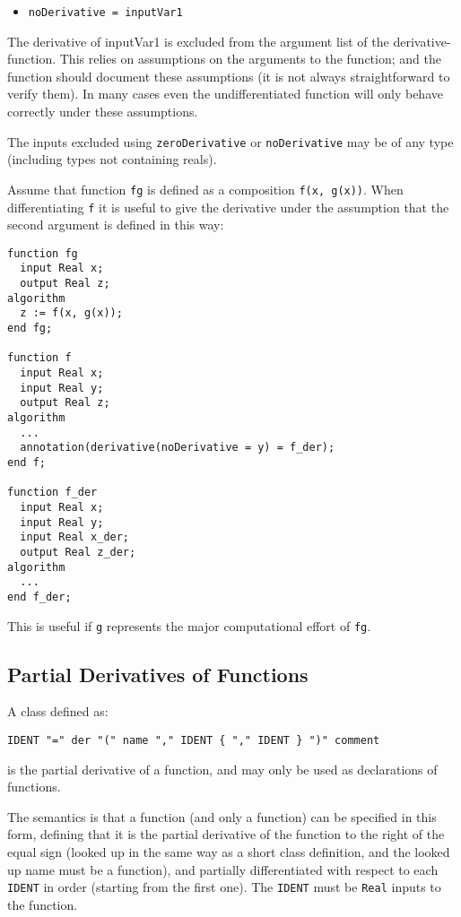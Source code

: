 \begin{itemize}
\item
  \lstinline!noDerivative = inputVar1!
\end{itemize}

The derivative of inputVar1 is excluded from the argument list of the
derivative-function. This relies on assumptions on the arguments to the
function; and the function should document these assumptions (it is not
always straightforward to verify them). In many cases even the
undifferentiated function will only behave correctly under these
assumptions.

The inputs excluded using \lstinline!zeroDerivative! or \lstinline!noDerivative! may be of any type (including types not containing reals).

\begin{nonnormative}
Assume that function \lstinline!fg! is defined as a composition \lstinline!f(x, g(x))!.
When differentiating \lstinline!f! it is useful to give the derivative under the
assumption that the second argument is defined in this way:
\begin{lstlisting}[language=modelica]
function fg
  input Real x;
  output Real z;
algorithm
  z := f(x, g(x));
end fg;

function f
  input Real x;
  input Real y;
  output Real z;
algorithm
  ...
  annotation(derivative(noDerivative = y) = f_der);
end f;

function f_der
  input Real x;
  input Real y;
  input Real x_der;
  output Real z_der;
algorithm
  ...
end f_der;
\end{lstlisting}
This is useful if \lstinline!g! represents the major computational
effort of \lstinline!fg!.
\end{nonnormative}

\subsection{Partial Derivatives of Functions}\label{partial-derivatives-of-functions}

A class defined as:
\begin{lstlisting}[language=grammar]
IDENT "=" der "(" name "," IDENT { "," IDENT } ")" comment
\end{lstlisting}
is the partial derivative of a function, and may only be used as declarations of functions.

The semantics is that a function (and only a function) can be specified in this form, defining that it is the partial derivative of the function to the right of the equal sign (looked up in the same way as a short class definition, and the looked up name must be a function), and partially differentiated with respect to each \lstinline!IDENT! in order (starting from the first one).  The \lstinline!IDENT! must be \lstinline!Real! inputs to the function.

